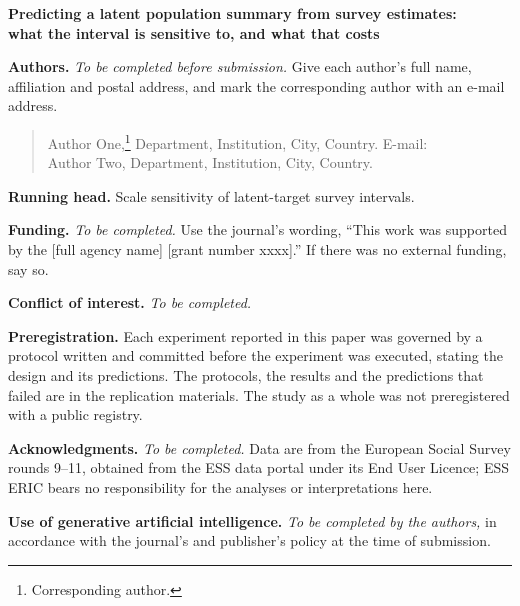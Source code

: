 \documentclass[12pt]{article}
\begin{document}
\thispagestyle{empty}

\begin{center}
{\large\bfseries Predicting a latent population summary from survey estimates:\\
what the interval is sensitive to, and what that costs}
\end{center}

\vspace{1em}

\noindent\textbf{Authors.} \emph{To be completed before submission.} Give each
author's full name, affiliation and postal address, and mark the corresponding
author with an e-mail address.

\begin{quote}
Author One,\footnote{Corresponding author.} Department, Institution, City,
Country. E-mail: \texttt{}\\
Author Two, Department, Institution, City, Country.
\end{quote}

\noindent\textbf{Running head.} Scale sensitivity of latent-target survey
intervals.

\vspace{1em}

\noindent\textbf{Funding.} \emph{To be completed.} Use the journal's wording,
``This work was supported by the [full agency name] [grant number xxxx].'' If
there was no external funding, say so.

\vspace{1em}

\noindent\textbf{Conflict of interest.} \emph{To be completed.}

\vspace{1em}

\noindent\textbf{Preregistration.} Each experiment reported in this paper was
governed by a protocol written and committed before the experiment was executed,
stating the design and its predictions. The protocols, the results and the
predictions that failed are in the replication materials. The study as a whole
was not preregistered with a public registry.

\vspace{1em}

\noindent\textbf{Acknowledgments.} \emph{To be completed.} Data are from the
European Social Survey rounds 9--11, obtained from the ESS data portal under its
End User Licence; ESS ERIC bears no responsibility for the analyses or
interpretations here.

\vspace{1em}

\noindent\textbf{Use of generative artificial intelligence.} \emph{To be
completed by the authors,} in accordance with the journal's and publisher's
policy at the time of submission.
\end{document}
